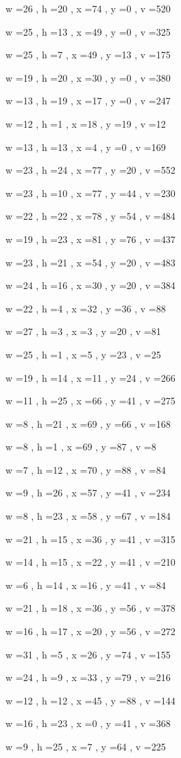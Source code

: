 \documentclass[11pt]{article}
\begin{document}
w =26 , h =20 , x =74 , y =0 , v =520
\par
w =25 , h =13 , x =49 , y =0 , v =325
\par
w =25 , h =7 , x =49 , y =13 , v =175
\par
w =19 , h =20 , x =30 , y =0 , v =380
\par
w =13 , h =19 , x =17 , y =0 , v =247
\par
w =12 , h =1 , x =18 , y =19 , v =12
\par
w =13 , h =13 , x =4 , y =0 , v =169
\par
w =23 , h =24 , x =77 , y =20 , v =552
\par
w =23 , h =10 , x =77 , y =44 , v =230
\par
w =22 , h =22 , x =78 , y =54 , v =484
\par
w =19 , h =23 , x =81 , y =76 , v =437
\par
w =23 , h =21 , x =54 , y =20 , v =483
\par
w =24 , h =16 , x =30 , y =20 , v =384
\par
w =22 , h =4 , x =32 , y =36 , v =88
\par
w =27 , h =3 , x =3 , y =20 , v =81
\par
w =25 , h =1 , x =5 , y =23 , v =25
\par
w =19 , h =14 , x =11 , y =24 , v =266
\par
w =11 , h =25 , x =66 , y =41 , v =275
\par
w =8 , h =21 , x =69 , y =66 , v =168
\par
w =8 , h =1 , x =69 , y =87 , v =8
\par
w =7 , h =12 , x =70 , y =88 , v =84
\par
w =9 , h =26 , x =57 , y =41 , v =234
\par
w =8 , h =23 , x =58 , y =67 , v =184
\par
w =21 , h =15 , x =36 , y =41 , v =315
\par
w =14 , h =15 , x =22 , y =41 , v =210
\par
w =6 , h =14 , x =16 , y =41 , v =84
\par
w =21 , h =18 , x =36 , y =56 , v =378
\par
w =16 , h =17 , x =20 , y =56 , v =272
\par
w =31 , h =5 , x =26 , y =74 , v =155
\par
w =24 , h =9 , x =33 , y =79 , v =216
\par
w =12 , h =12 , x =45 , y =88 , v =144
\par
w =16 , h =23 , x =0 , y =41 , v =368
\par
w =9 , h =25 , x =7 , y =64 , v =225
\par
\newpage
\end{document}
